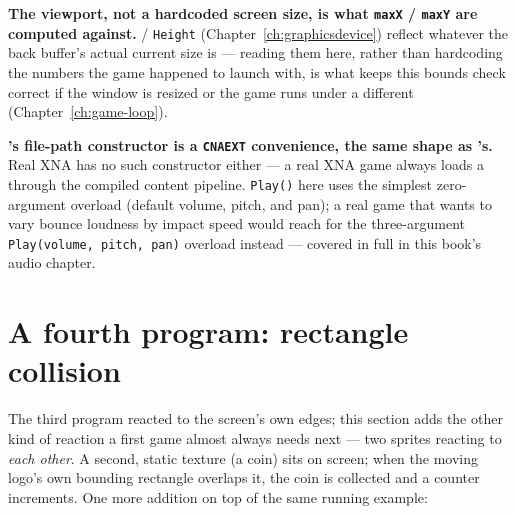 \textbf{The viewport, not a hardcoded screen size, is what \texttt{maxX} / \texttt{maxY} are
computed against.}  / \texttt{Height} (Chapter~\ref{ch:graphicsdevice})
reflect whatever the back buffer's actual current size is --- reading them here, rather than
hardcoding the numbers the game happened to launch with, is what keeps this bounds check
correct if the window is resized or the game runs under a different
 (Chapter~\ref{ch:game-loop}).

\textbf{'s file-path constructor is a \texttt{CNAEXT} convenience, the
same shape as 's.} Real XNA has no such constructor either --- a real XNA
game always loads a  through the compiled content pipeline. \texttt{Play()}
here uses the simplest zero-argument overload (default volume, pitch, and pan); a real game
that wants to vary bounce loudness by impact speed would reach for the three-argument
\texttt{Play(volume, pitch, pan)} overload instead --- covered in full in this book's audio
chapter.

\section{A fourth program: rectangle collision}

The third program reacted to the screen's own edges; this section adds the other kind of
reaction a first game almost always needs next --- two sprites reacting to \emph{each other}.
A second, static texture (a coin) sits on screen; when the moving logo's own bounding rectangle
overlaps it, the coin is collected and a counter increments. One more addition
on top of the same running example:

